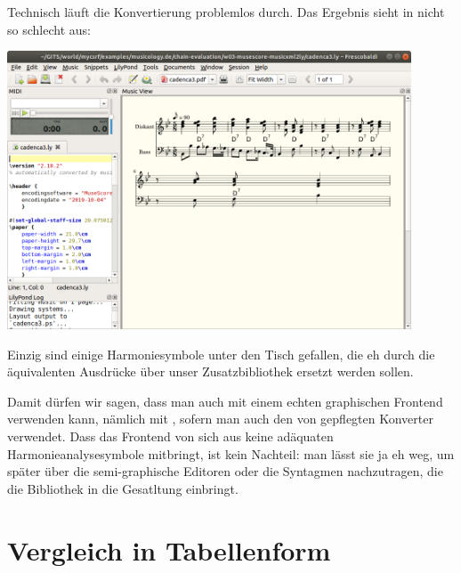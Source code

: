 Technisch läuft die Konvertierung problemlos durch. Das Ergebnis sieht in
 nicht so schlecht aus:


\begin{center}
\includegraphics[width=0.9\textwidth]{frontends/musescore/musescore-cadenca3-in-frescobaldi.png}
\end{center}

Einzig sind einige Harmoniesymbole unter den Tisch gefallen, die eh durch die
äquivalenten Ausdrücke über unser Zusatzbibliothek  ersetzt
werden sollen.

Damit dürfen wir sagen, dass man  auch mit einem echten
graphischen Frontend verwenden kann, nämlich mit , sofern man
auch den von  gepflegten Konverter 
verwendet. Dass das Frontend  von sich aus keine adäquaten
Harmonieanalysesymbole mitbringt, ist kein Nachteil: man lässt sie ja eh
weg, um später über die semi-graphische Editoren  oder
 die Syntagmen nachzutragen, die die Bibliothek 
in die Gesatltung einbringt.


\section{Vergleich in Tabellenform}

